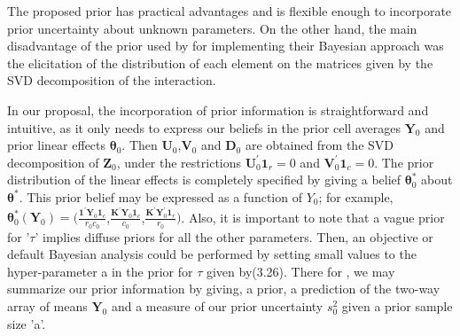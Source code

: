 The proposed prior has practical advantages and is flexible enough to incorporate prior uncertainty about unknown parameters. On the other hand, the main disadvantage of the prior used by  \citet{Jarquin2011} for implementing their Bayesian approach was the elicitation of the distribution of each element on the matrices given by the SVD decomposition of the interaction. 

In our proposal, the incorporation of prior information is straightforward and intuitive, as it only needs to express our beliefs in the prior cell averages $\textbf{Y}_0$ and prior linear effects $\bm{\theta}_0$. Then $\textbf{U}_0$,$\textbf{V}_0$ and $\textbf{D}_0$ are obtained from the SVD decomposition of $\textbf{Z}_0$, under the restrictions $\textbf{U}_0^\prime \textbf{1}_r=0$ and $\textbf{V}_0^\prime \textbf{1}_c=0$. The prior distribution of the linear effects is completely specified by giving a belief $\bm{\theta}_0^*$ about $\bm{\theta}^*$. This prior belief may be expressed as a function of $Y_0$; for example, $\bm{\theta}_0^*(\textbf{Y}_0)=(\frac{\textbf{1}^\prime \textbf{Y}_0 \textbf{1}_c}{r_0c_0}$,$\frac{\textbf{K}^\prime \textbf {Y}_0 \textbf{1}_c}{c_0}$,$\frac{\textbf{K}^\prime \textbf{Y}_0^\prime \textbf{1}_r}{r_0}) $. Also, it is important to note that a vague prior for '$\tau$' implies diffuse priors for all the other parameters. Then, an objective or default Bayesian analysis could be performed by setting small values to the hyper-parameter a in the prior for $\tau$ given by(3.26). There for , we may summarize our prior information by giving, a prior, a prediction of the two-way array of means $\textbf{Y}_0$ and a measure of our prior uncertainty $s_0^2$ given a prior sample size 'a'. 

